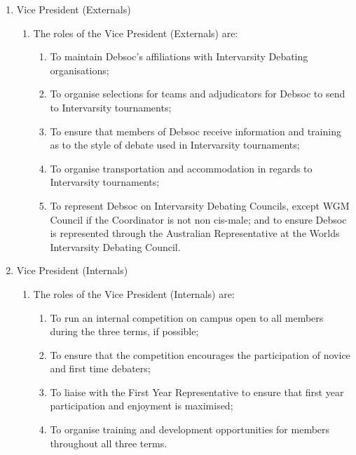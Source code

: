 \begin{enumerate}
\item Vice President (Externals)
  \begin{enumerate}
  \item The roles of the Vice President (Externals) are:
    \begin{enumerate}
    \item To maintain Debsoc’s affiliations with Intervarsity Debating organisations;
    \item To organise selections for teams and adjudicators for Debsoc to send to Intervarsity tournaments;
    \item To ensure that members of Debsoc receive information and training as to the style of debate used in Intervarsity tournaments;
    \item To organise transportation and accommodation in regards to Intervarsity tournaments;
    \item To represent Debsoc on Intervarsity Debating Councils, except WGM Council if the Coordinator is not non cis-male; and to ensure Debsoc is represented through the Australian Representative at the Worlds Intervarsity Debating Council.
    \end{enumerate}
  \end{enumerate}

\item Vice President (Internals)
  \begin{enumerate}
  \item The roles of the Vice President (Internals) are:
    \begin{enumerate}
    \item To run an internal competition on campus open to all members during the three terms, if possible;
    \item To ensure that the competition encourages the participation of novice and first time debaters;
    \item To liaise with the First Year Representative to ensure that first year participation and enjoyment is maximised;
    \item To organise training and development opportunities for members throughout all three terms.
    \end{enumerate}
  \end{enumerate}


\end{enumerate}
